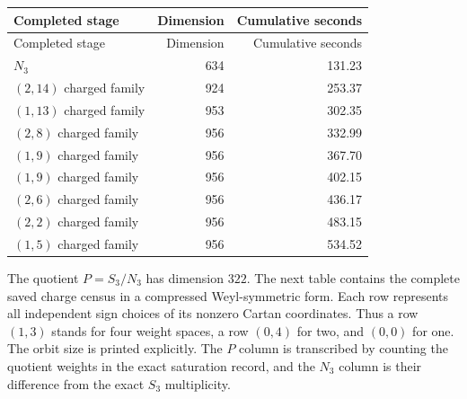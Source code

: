 \begin{longtable}{@{}lrr@{}}
\toprule Completed stage&Dimension&Cumulative seconds\\\midrule\endfirsthead
\toprule Completed stage&Dimension&Cumulative seconds\\\midrule\endhead
\bottomrule\endfoot
$N_3$ & 634 & 131.23\\
$(2, 14)$ charged family & 924 & 253.37\\
$(1, 13)$ charged family & 953 & 302.35\\
$(2, 8)$ charged family & 956 & 332.99\\
$(1, 9)$ charged family & 956 & 367.70\\
$(1, 9)$ charged family & 956 & 402.15\\
$(2, 6)$ charged family & 956 & 436.17\\
$(2, 2)$ charged family & 956 & 483.15\\
$(1, 5)$ charged family & 956 & 534.52\\
\end{longtable}
The quotient $P=S_3/N_3$ has dimension $322$. The next table
contains the complete saved charge census in a compressed Weyl-symmetric
form. Each row represents all independent sign choices of its nonzero
Cartan coordinates. Thus a row $(1,3)$ stands for four weight spaces,
a row $(0,4)$ for two, and $(0,0)$ for one. The orbit size is printed
explicitly. The $P$ column is transcribed by counting the quotient
weights in the exact saturation record, and the $N_3$ column is their
difference from the exact $S_3$ multiplicity.

